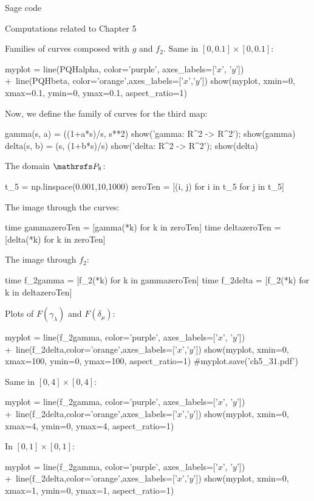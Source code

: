 \documentclass[11pt, a4paper, english, twoside, notitlepage, openright]{report}
\begin{document}
\begin{chapter}{Sage code}
\begin{section}{Computations related to Chapter 5}
\begin{subsection}{Families of curves composed with $g$ and $f_2$.}
Same in $[0,0.1]\times[0,0.1]$:
\begin{sage}
myplot = line(PQHalpha, color='purple', axes_labels=['$x$', '$y$']) +\
    line(PQHbeta, color='orange',axes_labels=['$x$','$y$'])
show(myplot, xmin=0, xmax=0.1, ymin=0, ymax=0.1, aspect_ratio=1)
\end{sage}

Now, we define the family of curves for the third map:
\begin{sage}
gamma(s, a) = ((1+a*s)/s, s**2)
show('gamma: R^2 -> R^2'); show(gamma)
delta(s, b) = (s, (1+b*s)/s)
show('delta: R^2 -> R^2'); show(delta)
\end{sage}

The domain $\PP_8$:
\begin{sage}
t_5 = np.linspace(0.001,10,1000)
zeroTen = [(i, j) for i in t_5 for j in t_5]
\end{sage}

The image through the curves:
\begin{sage}
time gammazeroTen = [gamma(*k) for k in zeroTen]
time deltazeroTen = [delta(*k) for k in zeroTen]
\end{sage}

The image through $f_2$:
\begin{sage}
time f_2gamma = [f_2(*k) for k in gammazeroTen]
time f_2delta = [f_2(*k) for k in deltazeroTen]
\end{sage}

Plots of $F(\gamma_\lambda)$ and $F(\delta_\mu)$:
\begin{sage}
myplot = line(f_2gamma, color='purple', axes_labels=['$x$', '$y$']) +\
    line(f_2delta,color='orange',axes_labels=['$x$','$y$'])
show(myplot, xmin=0, xmax=100, ymin=0, ymax=100, aspect_ratio=1)
#myplot.save('ch5_31.pdf')
\end{sage}

Same in $[0,4]\times[0, 4]$:
\begin{sage}
myplot = line(f_2gamma, color='purple', axes_labels=['$x$', '$y$']) +\
    line(f_2delta,color='orange',axes_labels=['$x$','$y$'])
show(myplot, xmin=0, xmax=4, ymin=0, ymax=4, aspect_ratio=1)
\end{sage}

In $[0,1]\times[0, 1]$:
\begin{sage}
myplot = line(f_2gamma, color='purple', axes_labels=['$x$', '$y$']) +\
    line(f_2delta,color='orange',axes_labels=['$x$','$y$'])
show(myplot, xmin=0, xmax=1, ymin=0, ymax=1, aspect_ratio=1)
\end{sage}


\end{subsection}
\end{section}
\end{chapter}
\end{document}
